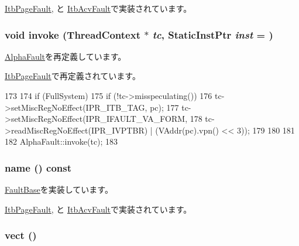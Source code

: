 \hyperlink{classAlphaISA_1_1ItbPageFault_a6c79663c761ff57265459f7e3aefaf4c}{ItbPageFault}, と \hyperlink{classAlphaISA_1_1ItbAcvFault_a6c79663c761ff57265459f7e3aefaf4c}{ItbAcvFault}で実装されています。\hypertarget{classAlphaISA_1_1ItbFault_a2bd783b42262278d41157d428e1f8d6f}{
\subsubsection[{invoke}]{\setlength{\rightskip}{0pt plus 5cm}void invoke ({\bf ThreadContext} $\ast$ {\em tc}, \/  {\bf StaticInstPtr} {\em inst} = {})}}
\label{classAlphaISA_1_1ItbFault_a2bd783b42262278d41157d428e1f8d6f}


\hyperlink{classAlphaISA_1_1AlphaFault_a2bd783b42262278d41157d428e1f8d6f}{AlphaFault}を再定義しています。

\hyperlink{classAlphaISA_1_1ItbPageFault_a2bd783b42262278d41157d428e1f8d6f}{ItbPageFault}で再定義されています。


\begin{DoxyCode}
173 {
174     if (FullSystem) {
175         if (!tc->misspeculating()) {
176             tc->setMiscRegNoEffect(IPR_ITB_TAG, pc);
177             tc->setMiscRegNoEffect(IPR_IFAULT_VA_FORM,
178                 tc->readMiscRegNoEffect(IPR_IVPTBR) | (VAddr(pc).vpn() << 3));
179         }
180     }
181 
182     AlphaFault::invoke(tc);
183 }
\end{DoxyCode}
\hypertarget{classAlphaISA_1_1ItbFault_a09ac100f5ad40cf1726c4e60925c2522}{
\subsubsection[{name}]{ name () const}}
\label{classAlphaISA_1_1ItbFault_a09ac100f5ad40cf1726c4e60925c2522}


\hyperlink{classFaultBase_aad960357563b8b969d2dffdcc6861de7}{FaultBase}を実装しています。

\hyperlink{classAlphaISA_1_1ItbPageFault_a73adb23259baf912a81683a9790a303f}{ItbPageFault}, と \hyperlink{classAlphaISA_1_1ItbAcvFault_a73adb23259baf912a81683a9790a303f}{ItbAcvFault}で実装されています。\hypertarget{classAlphaISA_1_1ItbFault_ae7a41506fab06a3c1e392f5286f14c66}{
\subsubsection[{vect}]{ vect ()}}
\label{classAlphaISA_1_1ItbFault_ae7a41506fab06a3c1e392f5286f14c66}


